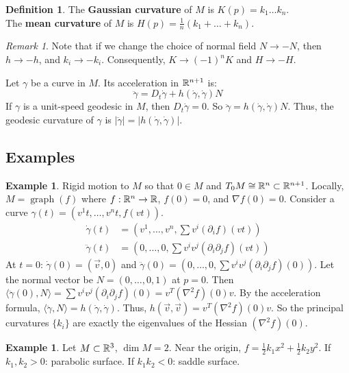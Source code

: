 \documentclass[11pt, a4paper]{article}
\theoremstyle{plain}
\theoremstyle{definition}
\newtheorem{definition}[theorem]{Definition}
\newtheorem{example}[theorem]{Example}
\theoremstyle{remark}
\newtheorem{remark}[theorem]{Remark}
\begin{document}
{\begin{definition}
The \textbf{Gaussian curvature} of $M$ is $K(p) = k_1 \dots k_n$. \\
The \textbf{mean curvature} of $M$ is $H(p) = \frac{1}{n}(k_1 + \dots + k_n)$.
\end{definition}

\begin{remark}
Note that if we change the choice of normal field $N \to -N$, then $h \to -h$, and $k_i \to -k_i$. Consequently, $K \to (-1)^n K$ and $H \to -H$.
\end{remark}

Let $\gamma$ be a curve in $M$. Its acceleration in $\mathbb{R}^{n+1}$ is:
\[ \ddot{\gamma} = D_t \dot{\gamma} + h(\dot{\gamma}, \dot{\gamma})N \]
If $\gamma$ is a unit-speed geodesic in $M$, then $D_t \dot{\gamma} = 0$. So $\ddot{\gamma} = h(\dot{\gamma}, \dot{\gamma})N$. Thus, the geodesic curvature of $\gamma$ is $|\ddot{\gamma}| = |h(\dot{\gamma}, \dot{\gamma})|$.

\subsection*{Examples}
\begin{example}
Rigid motion to $M$ so that $0 \in M$ and $T_0 M \cong \mathbb{R}^n \subset \mathbb{R}^{n+1}$. Locally, $M = \operatorname{graph}(f)$ where $f: \mathbb{R}^n \to \mathbb{R}$, $f(0) = 0$, and $\nabla f(0) = 0$.
Consider a curve $\gamma(t) = (v^1 t, \dots, v^n t, f(v t))$.
\begin{align*}
    \dot{\gamma}(t) &= \left(v^1, \dots, v^n, \sum v^i (\partial_i f)(v t)\right) \\
    \ddot{\gamma}(t) &= \left(0, \dots, 0, \sum v^i v^j (\partial_i \partial_j f)(v t)\right)
\end{align*}
At $t=0$: $\dot{\gamma}(0) = (\vec{v}, 0)$ and $\ddot{\gamma}(0) = (0, \dots, 0, \sum v^i v^j (\partial_i \partial_j f)(0))$.
Let the normal vector be $N = (0, \dots, 0, 1)$ at $p=0$. 
Then $\langle \ddot{\gamma}(0), N \rangle = \sum v^i v^j (\partial_i \partial_j f)(0) = v^T (\nabla^2 f)(0) v$.
By the acceleration formula, $\langle \ddot{\gamma}, N \rangle = h(\dot{\gamma}, \dot{\gamma})$. Thus, $h(\vec{v}, \vec{v}) = v^T (\nabla^2 f)(0) v$. So the principal curvatures $\{k_i\}$ are exactly the eigenvalues of the Hessian $(\nabla^2 f)(0)$.
\end{example}

\begin{example}
Let $M \subset \mathbb{R}^3$, $\dim M = 2$. Near the origin, $f = \frac{1}{2} k_1 x^2 + \frac{1}{2} k_2 y^2$.
If $k_1, k_2 > 0$: parabolic surface. If $k_1 k_2 < 0$: saddle surface.
\end{example}

}
\end{document}
